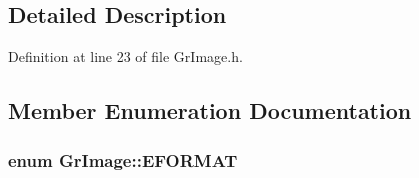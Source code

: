 \begin{CompactItemize}
\subsection{Detailed Description}


Definition at line 23 of file GrImage.h.

\subsection{Member Enumeration Documentation}
\hypertarget{class_gr_image_55bbf2a220e037e07616bb9c3f049786}{
\subsubsection[{EFORMAT}]{\setlength{\rightskip}{0pt plus 5cm}enum {\bf GrImage::EFORMAT}}}
\label{class_gr_image_55bbf2a220e037e07616bb9c3f049786}



\end{CompactItemize}
